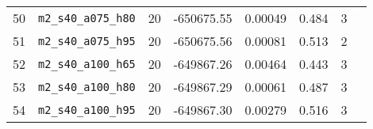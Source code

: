 \begin{table}[ht]
\begin{tabular}{cccccccc}
    50 & \verb|m2_s40_a075_h80| &       20 & -650675.55 &  0.00049 &     0.484 &      3      \\
    51 & \verb|m2_s40_a075_h95| &       20 & -650675.56 &  0.00081 &     0.513 &      2      \\
    52 & \verb|m2_s40_a100_h65| &       20 & -649867.26 &  0.00464 &     0.443 &      3      \\
    53 & \verb|m2_s40_a100_h80| &       20 & -649867.29 &  0.00061 &     0.487 &      3      \\
    54 & \verb|m2_s40_a100_h95| &       20 & -649867.30 &  0.00279 &     0.516 &      3      \\
    \hline
  \end{tabular}
\end{table}
\clearpage
